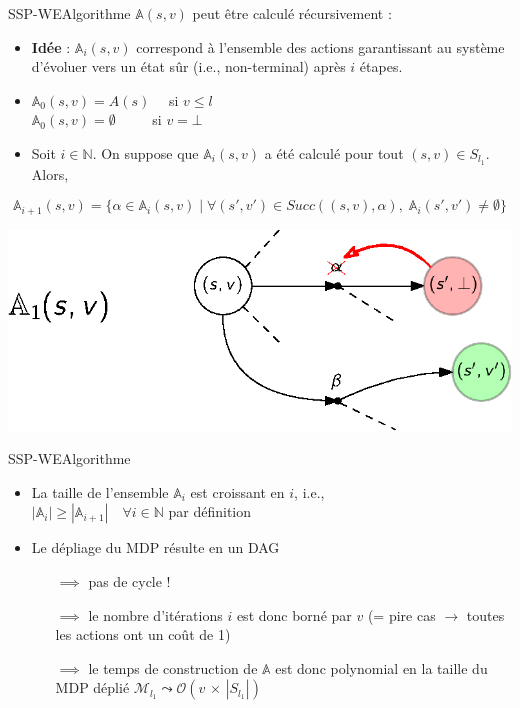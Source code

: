 \documentclass[compress]{beamer}
\theoremstyle{theorem}%
\begin{document}
\begin{frame}{SSP-WE}{Algorithme}
\footnotesize
$\mathbb{A}(s, v)$ peut être calculé récursivement :
\begin{itemize}
  \item \textbf{\color{fibeamer@orange}Idée} : $\mathbb{A}_i(s, v)$ correspond à l'ensemble des actions garantissant au système d'évoluer vers un état sûr (i.e., non-terminal) après $i$ étapes.
  \item $\mathbb{A}_0(s, v) = A(s) \quad $ si $v \leq l$ \\
        $\mathbb{A}_0(s, v) = \emptyset \quad \quad \;$ si $v = \bot$
  \item Soit $i \in \mathbb{N}$. On suppose que $\mathbb{A}_i(s, v)$ a été
    calculé pour tout $(s, v) \in S_{l_1}$. Alors,
\end{itemize}
{
    \[
      \mathbb{A}_{i+1}(s, v) = \{ \alpha \in \mathbb{A}_i(s, v) \; | \;
        \forall (s', v') \in Succ( (s, v), \alpha ), \; \mathbb{A}_i(s', v') \neq \emptyset \}
    \]
}
\begin{center}
  \includegraphics[width=0.5\linewidth]{resources/attractor}
\end{center}
\end{frame}

\begin{frame}{SSP-WE}{Algorithme}
  \begin{itemize}
    \item La taille de l'ensemble $\mathbb{A}_i$ est croissant en $i$, i.e., \\
      $|\mathbb{A}_{i}| \geq |\mathbb{A}_{i+1}| \quad \forall i \in \mathbb{N}$ par définition
    \item Le dépliage du MDP résulte en un DAG
    \begin{itemize}
      \item[$\implies$] pas de cycle !
      \item[$\implies$] le nombre d'itérations $i$ est donc borné par $v$ (= pire cas $\rightarrow$ toutes les actions ont un coût de 1)
      \item[$\implies$] le temps de construction de $\mathbb{A}$ est donc polynomial en la taille du MDP déplié $\mathcal{M}_{l_1} \leadsto \mathcal{O}(v \, \times \, |S_{l_1}|)$
    \end{itemize}
  \end{itemize}
\end{frame}
\end{document}
